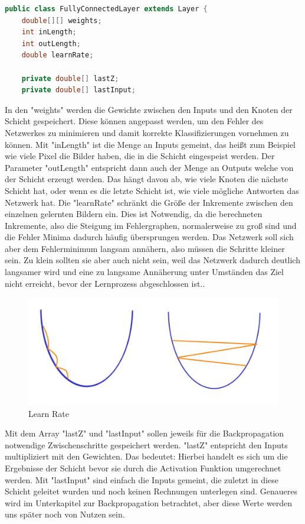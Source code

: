 \documentclass[12pt]{article}
\begin{document}
\begin{lstlisting}[language=Java]
public class FullyConnectedLayer extends Layer {
    double[][] weights;
    int inLength;
    int outLength;
    double learnRate;

    private double[] lastZ;
    private double[] lastInput;
\end{lstlisting} 
In den "weights" werden die Gewichte zwischen den Inputs und den Knoten der Schicht gespeichert. Diese können angepasst werden, um den Fehler des Netzwerkes zu minimieren und damit korrekte Klassifizierungen vornehmen zu können.
Mit "inLength" ist die Menge an Inputs gemeint, das heißt zum Beispiel wie viele Pixel die Bilder haben, die in die Schicht eingespeist werden.
Der Parameter "outLength" entspricht dann auch der Menge an Outputs welche von der Schicht erzeugt werden. Das hängt davon ab, wie viele Knoten die nächste Schicht hat, oder wenn es die letzte Schicht ist, wie viele mögliche Antworten das Netzwerk hat.
Die "learnRate" schränkt die Größe der Inkremente zwischen den einzelnen gelernten Bildern ein. Dies ist Notwendig, da die berechneten Inkremente, also die Steigung im Fehlergraphen, normalerweise zu groß sind und die Fehler Minima dadurch häufig übersprungen werden. Das Netzwerk soll sich aber dem Fehlerminimum langsam annähern, also müssen die Schritte kleiner sein. Zu klein sollten sie aber auch nicht sein, weil das Netzwerk dadurch deutlich langsamer wird und eine zu langsame Annäherung unter Umständen das Ziel nicht erreicht, bevor der Lernprozess abgeschlossen ist..


\begin{figure}[H]
\centering
\includegraphics[scale=0.50]{./Images/006_LearnRate.jpg}
\caption{Learn Rate}
\label{Learn Rate}
\end{figure}

Mit dem Array "lastZ" und "lastInput" sollen jeweils für die Backpropagation notwendige Zwischenschritte gespeichert werden. "lastZ" entspricht den Inputs multipliziert mit den Gewichten. Das bedeutet: Hierbei handelt es sich um die Ergebnisse der Schicht bevor sie durch die Activation Funktion umgerechnet werden. Mit "lastInput" sind einfach die Inputs gemeint, die zuletzt in diese Schicht geleitet wurden und noch keinen Rechnungen unterlegen sind. Genaueres wird im Unterkapitel zur Backpropagation betrachtet, aber diese Werte werden uns später noch von Nutzen sein.
\end{document}
